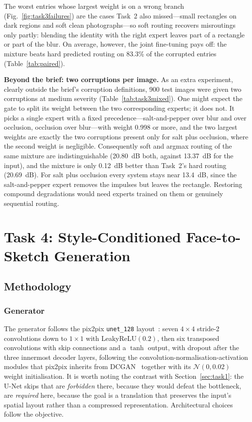\documentclass[conference]{IEEEtran}
\begin{document}
The worst entries whose largest weight is on a wrong branch
(Fig.~\ref{fig:task3failures}) are the cases Task~2 also missed---small rectangles on
dark regions and soft clean photographs---so soft routing recovers misroutings
only partly: blending the identity with the right expert leaves part of a rectangle
or part of the blur. On average, however, the joint fine-tuning pays off: the
mixture beats hard predicted routing on 83.3\% of the corrupted entries
(Table~\ref{tab:paired}).

\textbf{Beyond the brief: two corruptions per image.} As an extra experiment,
clearly outside the brief's corruption definitions, 900 test images were given two
corruptions at medium severity (Table~\ref{tab:task3mixed}). One might expect the
gate to split its weight between the two corresponding experts; it does not. It
picks a single expert with a fixed precedence---salt-and-pepper over blur and over
occlusion, occlusion over blur---with weight 0.998 or more, and the two largest
weights are exactly the two corruptions present only for salt plus occlusion, where
the second weight is negligible. Consequently soft and argmax routing of the same
mixture are indistinguishable (20.80~dB both, against 13.37~dB for the input), and
the mixture is only 0.12~dB better than Task~2's hard routing (20.69~dB). For salt
plus occlusion every system stays near 13.4~dB, since the salt-and-pepper expert
removes the impulses but leaves the rectangle. Restoring compound degradations
would need experts trained on them or genuinely sequential routing.

\section{Task 4: Style-Conditioned Face-to-Sketch Generation}
\label{sec:task4}

\subsection{Methodology}

\subsubsection{Generator}

The generator follows the pix2pix \texttt{unet\_128} layout~\cite{isola2017image}:
seven $4\times4$ stride-2 convolutions down to $1\times1$ with LeakyReLU$(0.2)$,
then six transposed convolutions with skip connections and a $\tanh$ output,
with dropout after the three innermost decoder layers, following the
convolution-normalisation-activation modules that pix2pix inherits from
DCGAN~\cite{radford2016unsupervised} together with its $\mathcal{N}(0, 0.02)$
weight initialisation. It is worth noting the
contrast with Section~\ref{sec:task1}: the U-Net skips that are \emph{forbidden}
there, because they would defeat the bottleneck, are \emph{required} here,
because the goal is a translation that preserves the input's spatial layout
rather than a compressed representation. Architectural choices follow the
objective.
\end{document}
